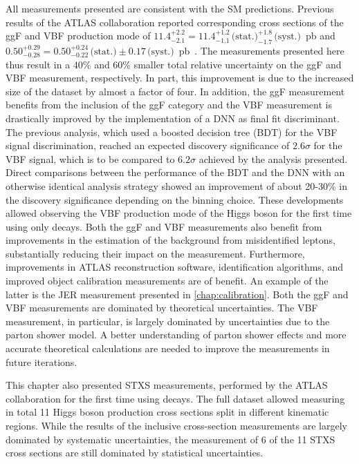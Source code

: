 All measurements presented are consistent with the SM predictions. 
Previous \RunTwo results of the ATLAS collaboration reported corresponding cross sections of the ggF and VBF production mode of $11.4^{+2.2}_{-2.1} = 11.4^{+1.2}_{-1.1}\,\text{(stat.)}^{+1.8}_{-1.7}\,\text{(syst.)}$~pb and $0.50^{+0.29}_{-0.28} = 0.50^{+0.24}_{-0.22}\,\text{(stat.)}\pm 0.17\,\text{(syst.)}$~pb~\cite{HIGG-2016-07}.
The measurements presented here thus result in a 40\% and 60\% smaller total relative uncertainty on the ggF and VBF measurement, respectively. In part, this improvement is due to the increased size of the dataset by almost a factor of four.
In addition, the ggF measurement benefits from the inclusion of the ggF \TwoJet category and the VBF measurement is drastically improved by the implementation of a DNN as final fit discriminant. 
The previous analysis, which used a boosted decision tree (BDT) for the VBF signal discrimination, reached an expected discovery significance of $2.6\sigma$ for the VBF signal, which is to be compared to $6.2\sigma$ achieved by the analysis presented. 
Direct comparisons between the performance of the BDT and the DNN with an otherwise identical analysis strategy showed an improvement of about 20-30\% in the discovery significance depending on the binning choice. %
These developments allowed observing the VBF production mode of the Higgs boson for the first time using only \HWW decays.
Both the ggF and VBF measurements also benefit from improvements in the estimation of the background from misidentified leptons, substantially reducing their impact on the measurement. 
Furthermore, improvements in ATLAS reconstruction software, identification algorithms, and improved object calibration measurements are of benefit. 
An example of the latter is the JER measurement presented in \cref{chap:calibration}. 
Both the ggF and VBF measurements are dominated by theoretical uncertainties. 
The VBF measurement, in particular, is largely dominated by uncertainties due to the parton shower model. 
A better understanding of parton shower effects and more accurate theoretical calculations are needed to improve the measurements in future iterations.~\cite{J_ger_2020} 

This chapter also presented STXS measurements, performed by the ATLAS collaboration for the first time using \HWW decays. 
The full \RunTwo dataset allowed measuring in total 11 Higgs boson production cross sections split in different kinematic regions. 
While the results of the inclusive cross-section measurements are largely dominated by systematic uncertainties, the measurement of 6 of the 11 STXS cross sections are still dominated by statistical uncertainties. 

